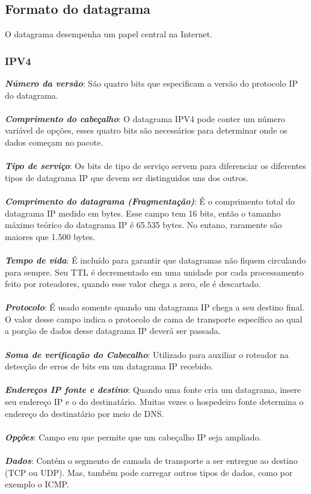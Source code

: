 \documentclass[a4paper, 12pt]{article}
\begin{document}
    \subsection{Formato do datagrama}
    O datagrama desempenha um papel central na Internet.

        \subsubsection{IPV4}
        \textbf{\textit{Número da versão}}: São quatro bits que especificam a versão do protocolo IP do datagrama.
        \\\\
        \textbf{\textit{Comprimento do cabeçalho}}: O datagrama IPV4 pode conter um número variável de opções, esses quatro bits
        são necessários para determinar onde os dados começam no pacote.
        \\\\
        \textbf{\textit{Tipo de serviço}}: Os bits de tipo de serviço servem para diferenciar os diferentes tipos de datagrama IP
        que devem ser distinguidos uns dos outros.
        \\\\
        \textbf{\textit{Comprimento do datagrama (Fragmentação)}}:
        É o comprimento total do datagrama IP medido em bytes. Esse campo tem 16 bits, então o tamanho máximo teórico do datagrama
        IP é 65.535 bytes. No entano, raramente são maiores que 1.500 bytes.
        \\\\
        \textbf{\textit{Tempo de vida}}: É incluído para garantir que datagramas não fiquem circulando para sempre. Seu TTL é 
        decrementado em uma unidade por cada processamento feito por roteadores, quando esse valor chega a zero, ele é descartado.
        \\\\
        \textbf{\textit{Protocolo}}: É usado somente quando um datagrama IP chega a seu destino final. O valor desse campo indica
        o protocolo de cama de transporte específico ao qual a porção de dados desse datagrama IP deverá ser passada.
        \\\\
        \textbf{\textit{Soma de verificação do Cabecalho}}: Utilizado para auxiliar o roteador na detecção de erros de bits em
        um datagrama IP recebido.
        \\\\
        \textbf{\textit{Endereços IP fonte e destino}}: Quando uma fonte cria um datagrama, insere seu endereço IP e o do destinatário.
        Muitas vezes o hospedeiro fonte determina o endereço do destinatário por meio de DNS.
        \\\\
        \textbf{\textit{Opções}}: Campo em que permite que um cabeçalho IP seja ampliado.
        \\\\
        \textbf{\textit{Dados}}: Contém o segmento de camada de transporte a ser entregue ao destino (TCP ou UDP). Mas, também pode
        carregar outros tipos de dados, como por exemplo o ICMP.
\end{document}
